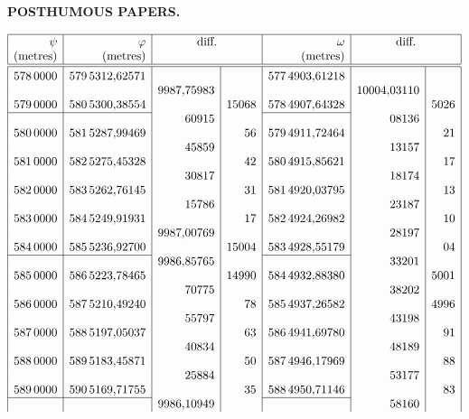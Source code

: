 \par\clearpage
{}\hfill{\small\textbf{POSTHUMOUS PAPERS.}}\hfill\null\par\medskip
{\small\renewcommand{\arraystretch}{.82}
\[\begin{array}{|r|r|r|r|r|r|r|}\hline
\rule{0pt}{2.1ex}\psi&\varphi&\multicolumn{2}{c|}{\text{diff.}}&\omega&\multicolumn{2}{c|}{\text{diff.}}\\
\rule[-3.6pt]{0pt}{3.6pt}\text{(metres)}&\text{(metres)}&\multicolumn{2}{c|}{}&\text{(metres)}&\multicolumn{2}{c|}{}\\\hline\hline
\rule{0pt}{2.5ex}578\,0000&579\,5312{,}62571&&&577\,4903{,}61218&&\\
&&9987{,}75983&&&10004{,}03110&\\
579\,0000&580\,5300{,}38554&&15068&578\,4907{,}64328&&5026\\
\cline{1-2}\cline{5-5}
&&60915&&&08136&\\
580\,0000&581\,5287{,}99469&&56&579\,4911{,}72464&&21\\
&&45859&&&13157&\\
581\,0000&582\,5275{,}45328&&42&580\,4915{,}85621&&17\\
&&30817&&&18174&\\
582\,0000&583\,5262{,}76145&&31&581\,4920{,}03795&&13\\
&&15786&&&23187&\\
583\,0000&584\,5249{,}91931&&17&582\,4924{,}26982&&10\\
&&9987{,}00769&&&28197&\\
584\,0000&585\,5236{,}92700&&15004&583\,4928{,}55179&&04\\
\cline{1-2}\cline{5-5}
&&9986{,}85765&&&33201&\\
585\,0000&586\,5223{,}78465&&14990&584\,4932{,}88380&&5001\\
&&70775&&&38202&\\
586\,0000&587\,5210{,}49240&&78&585\,4937{,}26582&&4996\\
&&55797&&&43198&\\
587\,0000&588\,5197{,}05037&&63&586\,4941{,}69780&&91\\
&&40834&&&48189&\\
588\,0000&589\,5183{,}45871&&50&587\,4946{,}17969&&88\\
&&25884&&&53177&\\
589\,0000&590\,5169{,}71755&&35&588\,4950{,}71146&&83\\
\cline{1-2}\cline{5-5}
&&9986{,}10949&&&58160&\\

\end{array}\]}

